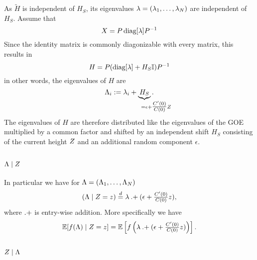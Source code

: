 As \(\tilde{H}\) is independent of \(H_S\), its eigenvalues
\(\lambda=(\lambda_1,\dots,\lambda_N)\) are independent of
\(H_S\). Assume that
\[
	X = P\operatorname{diag}[\lambda]P^{-1}
\]
Since the identity matrix is commonly diagonizable with every matrix, this
results in
\[
	H = P(\operatorname{diag}[\lambda] + H_S\mathbb{I}) P^{-1}
\]
in other words, the eigenvalues of \(H\) are
\[
	\Lambda_i
	:= \lambda_i + \underbrace{H_S}_{=\epsilon \mathrlap{+ \tfrac{\sqC'(0)}{\sqC(0)}\rf}}.
\]
The eigenvalues of \(H\) are therefore distributed like the eigenvalues of the
GOE multiplied by a common factor and shifted by an independent shift \(H_S\)
consisting of the current height \(Z\) and an additional random component
\(\epsilon\).

\subsection{\texorpdfstring{\(\Lambda\mid Z\)}{Λ|Z}}
\label{subsec: Lambda|rf}

In particular we have for \(\Lambda = (\Lambda_1,\dots,\Lambda_N)\)
\[
	(\Lambda \mid Z = z)
	\overset{d}= 
	\lambda \mathbin{.+} (\epsilon + \tfrac{C'(0)}{C(0)}z),
\]
where \(\mathbin{.+}\) is entry-wise addition.
More specifically we have
\begin{equation}\label{eq: expectation f(Lambda) | Z}
		\mathbb{E}[f(\Lambda)\mid Z=z]
		= \mathbb{E}\left[
			f\left(\lambda \mathbin{.+} (\epsilon+\tfrac{C'(0)}{C(0)}z)\right)
		\right].
\end{equation}

\subsection{\texorpdfstring{\(Z\mid\Lambda\)}{Z|Λ}}

